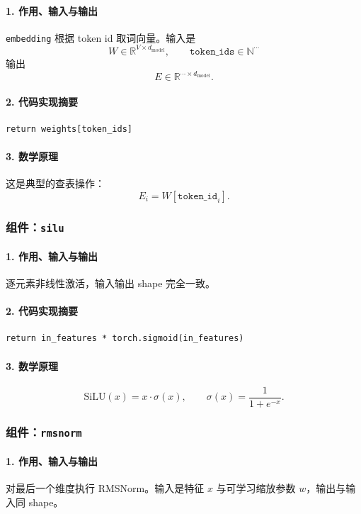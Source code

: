 \documentclass[UTF8,a4paper,11pt]{ctexart}
\begin{document}
\paragraph{1. 作用、输入与输出}
\texttt{embedding} 根据 token id 取词向量。输入是
\[
W \in \mathbb{R}^{V \times d_{\text{model}}}, \qquad \texttt{token\_ids} \in \mathbb{N}^{\cdots}
\]
输出
\[
E \in \mathbb{R}^{\cdots \times d_{\text{model}}}.
\]

\paragraph{2. 代码实现摘要}
\begin{lstlisting}
return weights[token_ids]
\end{lstlisting}

\paragraph{3. 数学原理}
这是典型的查表操作：
\[
E_{i} = W[\texttt{token\_id}_i].
\]

\subsubsection{组件：\texttt{silu}}
\paragraph{1. 作用、输入与输出}
逐元素非线性激活，输入输出 shape 完全一致。

\paragraph{2. 代码实现摘要}
\begin{lstlisting}
return in_features * torch.sigmoid(in_features)
\end{lstlisting}

\paragraph{3. 数学原理}
\[
\mathrm{SiLU}(x) = x \cdot \sigma(x), \qquad
\sigma(x)=\frac{1}{1+e^{-x}}.
\]

\subsubsection{组件：\texttt{rmsnorm}}
\paragraph{1. 作用、输入与输出}
对最后一个维度执行 RMSNorm。输入是特征 \(x\) 与可学习缩放参数 \(w\)，输出与输入同 shape。
\end{document}
